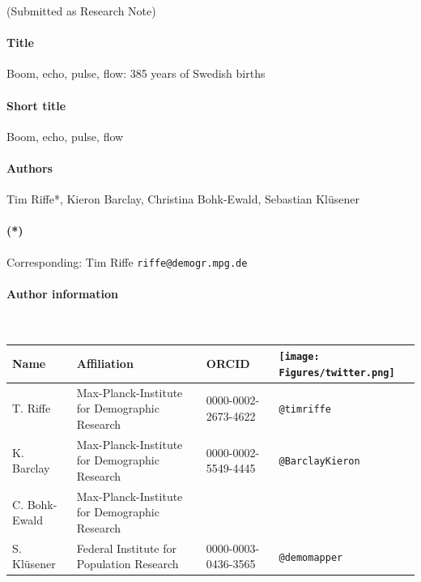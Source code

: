 \documentclass{article}
\begin{document}
(Submitted as Research Note)
\paragraph{Title} Boom, echo, pulse, flow: 385 years of Swedish births
\paragraph{Short title} Boom, echo, pulse, flow
\paragraph{Authors} Tim Riffe*, Kieron Barclay, Christina Bohk-Ewald, Sebastian Kl\"usener
\paragraph{(*)} Corresponding: Tim Riffe \texttt{riffe@demogr.mpg.de}

\paragraph{Author information} ~
\begin{table}[ht]
\begin{center}
\begin{tabular}{llll}
Name & Affiliation & ORCID & \texttt{[image: Figures/twitter.png]}  \\ \hline
T. Riffe & Max-Planck-Institute for Demographic Research & 0000-0002-2673-4622 & \texttt{@timriffe}  \\
K. Barclay & Max-Planck-Institute for Demographic Research & 0000-0002-5549-4445 & \texttt{@BarclayKieron}  \\
C. Bohk-Ewald & Max-Planck-Institute for Demographic Research &  &   \\
S. Kl\"usener &Federal Institute for Population Research& 0000-0003-0436-3565 & \texttt{@demomapper} 
\end{tabular}
\end{center}
\end{table}
\end{document}
